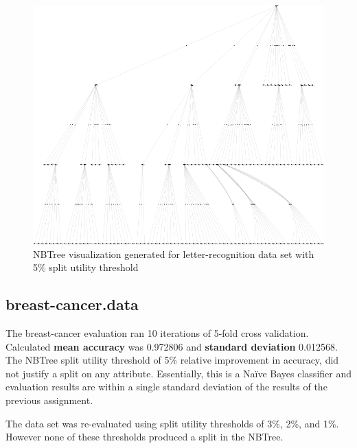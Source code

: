 \documentclass[10pt]{report}
\begin{document}
\begin{figure}
  \begin{center}
	\includegraphics[angle=90,width=!,height=\textheight]{letter-recognition}
  \end{center}
  \caption{NBTree visualization generated for letter-recognition data
    set with 5\% split utility threshold}
  \label{fig:letter-recognition}
\end{figure} 


\subsection*{breast-cancer.data}
The breast-cancer evaluation ran 10 iterations of 5-fold cross
validation. Calculated \textbf{mean accuracy} was 0.972806 and
\textbf{standard deviation} 0.012568. The NBTree split utility
threshold of 5\% relative improvement in accuracy, did not justify a
split on any attribute. Essentially, this is a Na\"{i}ve Bayes
classifier and evaluation results are within a single standard
deviation of the results of the previous assignment.

The data set was re-evaluated using split utility thresholds of 3\%,
2\%, and 1\%. However none of these thresholds produced a split in the
NBTree.






\end{document}
